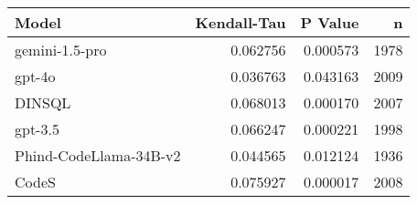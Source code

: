 \begin{tabular}{lrrr}
\toprule
Model & Kendall-Tau & P Value & n \\
\midrule
gemini-1.5-pro & 0.062756 & 0.000573 & 1978 \\
gpt-4o & 0.036763 & 0.043163 & 2009 \\
DINSQL & 0.068013 & 0.000170 & 2007 \\
gpt-3.5 & 0.066247 & 0.000221 & 1998 \\
Phind-CodeLlama-34B-v2 & 0.044565 & 0.012124 & 1936 \\
CodeS & 0.075927 & 0.000017 & 2008 \\
\bottomrule
\end{tabular}
